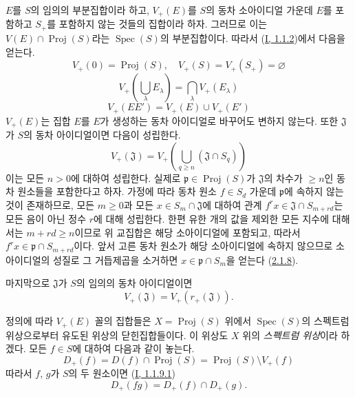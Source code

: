 \begin{env}[2.3.2]
\label{II.2.3.2-ko}
$E$를 $S$의 임의의 부분집합이라 하고, $V_+(E)$를 $S$의 동차
소아이디얼 가운데 $E$를 포함하고 $S_+$를 포함하지 않는 것들의 집합이라
하자. 그러므로 이는 $V(E)\cap\operatorname{Proj}(S)$라는
$\operatorname{Spec}(S)$의 부분집합이다. 따라서
(\hyperref[I.1.1.2-ko]{I, 1.1.2})에서 다음을 얻는다.
\[
  \label{II.2.3.2.1-ko}
  V_+(0)=\operatorname{Proj}(S),\quad
  V_+(S)=V_+(S_+)=\varnothing
  \tag{2.3.2.1}
\]
\[
  \label{II.2.3.2.2-ko}
  V_+\left(\bigcup_\lambda E_\lambda\right)
  =\bigcap_\lambda V_+(E_\lambda)
  \tag{2.3.2.2}
\]
\[
  \label{II.2.3.2.3-ko}
  V_+(EE')=V_+(E)\cup V_+(E')
  \tag{2.3.2.3}
\]
$V_+(E)$는 집합 $E$를 $E$가 생성하는 동차 아이디얼로 바꾸어도 변하지
않는다. 또한 $\mathfrak{J}$가 $S$의 동차 아이디얼이면 다음이 성립한다.
\[
  \label{II.2.3.2.4-ko}
  V_+(\mathfrak{J})
  =V_+\left(\bigcup_{q\geq n}(\mathfrak{J}\cap S_q)\right)
  \tag{2.3.2.4}
\]
이는 모든 $n>0$에 대하여 성립한다. 실제로
$\mathfrak{p}\in\operatorname{Proj}(S)$가 $\mathfrak{J}$의 차수가
$\geq n$인 동차 원소들을 포함한다고 하자. 가정에 따라 동차 원소
$f\in S_d$ 가운데 $\mathfrak{p}$에 속하지 않는 것이 존재하므로, 모든
$m\geq 0$과 모든 $x\in S_m\cap\mathfrak{J}$에 대하여 관계
$f^r x\in\mathfrak{J}\cap S_{m+rd}$는 모든 음이 아닌 정수 $r$에 대해
성립한다. 한편 유한 개의 값을 제외한 모든 지수에 대해서는
$m+rd\geq n$이므로 위 교집합은 해당 소아이디얼에 포함되고, 따라서
$f^r x\in\mathfrak{p}\cap S_{m+rd}$이다. 앞서 고른 동차 원소가 해당
소아이디얼에 속하지 않으므로 소아이디얼의 성질로 그 거듭제곱을 소거하면
$x\in\mathfrak{p}\cap S_m$을 얻는다
(\hyperref[II.2.1.8-ko]{2.1.8}).

마지막으로 $\mathfrak{J}$가 $S$의 임의의 동차 아이디얼이면
\[
  \label{II.2.3.2.5-ko}
  V_+(\mathfrak{J})=V_+(r_+(\mathfrak{J})).
  \tag{2.3.2.5}
\]
\end{env}

\begin{env}[2.3.3]
\label{II.2.3.3-ko}
정의에 따라 $V_+(E)$ 꼴의 집합들은 $X=\operatorname{Proj}(S)$ 위에서
$\operatorname{Spec}(S)$의 스펙트럼 위상으로부터 유도된 위상의
닫힌집합들이다. 이 위상도 $X$ 위의 \emph{스펙트럼 위상}이라 하겠다.
모든 $f\in S$에 대하여 다음과 같이 놓는다.
\[
  \label{II.2.3.3.1-ko}
  D_+(f)=D(f)\cap\operatorname{Proj}(S)
  =\operatorname{Proj}(S)\setminus V_+(f)
  \tag{2.3.3.1}
\]
따라서 $f$, $g$가 $S$의 두 원소이면
(\hyperref[I.1.1.9.1-ko]{I, 1.1.9.1})
\[
  \label{II.2.3.3.2-ko}
  D_+(fg)=D_+(f)\cap D_+(g).
  \tag{2.3.3.2}
\]
\end{env}

